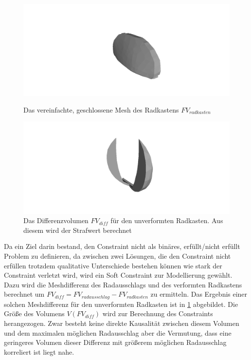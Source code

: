 \begin{figure}[h]
	\centering
	\begin{minipage}{0.45\textwidth}
		\centering
		\includegraphics[width=.5\linewidth]{bilder/simplified_wheelcase}
		\caption{Das vereinfachte, geschlossene Mesh des Radkastens $FV_{radkasten}$}
		\label{fig:wheelcase_volume}
	\end{minipage}\hfill
	\begin{minipage}{0.45\textwidth}
		\centering
		\includegraphics[width=.5\linewidth]{bilder/difference.png}
		\caption{Das Differenzvolumen $FV_{diff}$ für den unverformten Radkasten. Aus diesem wird der Strafwert berechnet}
		\label{fig:diff_volume}
	\end{minipage}
\end{figure}
Da ein Ziel darin bestand, den Constraint nicht als binäres, erfüllt/nicht erfüllt Problem zu definieren, da zwischen zwei Lösungen, die den Constraint nicht erfüllen trotzdem qualitative Unterschiede bestehen können wie stark der Constraint verletzt wird, wird ein Soft Constraint zur Modellierung gewählt.
Dazu wird die Meshdifferenz des Radausschlags und des verformten Radkastens berechnet um $FV_{diff} = FV_{radausschlag} - FV_{radkasten}$ zu ermitteln.
Das Ergebnis einer solchen Meshdifferenz für den unverformten Radkasten ist in \cref{fig:diff_volume} abgebildet.
Die Größe des Volumens $V(FV_{diff})$ wird zur Berechnung des Constraints herangezogen.
Zwar besteht keine direkte Kausalität zwischen diesem Volumen und dem maximalen möglichen Radausschlag aber die Vermutung, dass eine geringeres Volumen dieser Differenz mit größerem möglichen Radausschlag korreliert ist liegt nahe.

